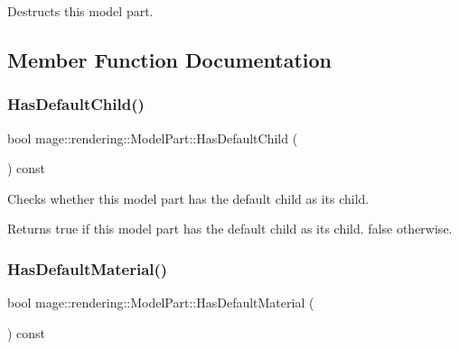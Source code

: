 Destructs this model part. 

\subsection{Member Function Documentation}
\hypertarget{structmage_1_1rendering_1_1_model_part_ab4118a267808c18556b0fa10949bcb0b}{}\label{structmage_1_1rendering_1_1_model_part_ab4118a267808c18556b0fa10949bcb0b} 
\subsubsection{\texorpdfstring{Has\+Default\+Child()}{HasDefaultChild()}}
{\footnotesize\ttfamily bool mage\+::rendering\+::\+Model\+Part\+::\+Has\+Default\+Child (\begin{DoxyParamCaption}{ }\end{DoxyParamCaption}) const\hspace{0.3cm}{\ttfamily [noexcept]}}

Checks whether this model part has the default child as its child.

\begin{DoxyReturn}{Returns}
{\ttfamily true} if this model part has the default child as its child. {\ttfamily false} otherwise. 
\end{DoxyReturn}
\hypertarget{structmage_1_1rendering_1_1_model_part_aae8cebe1ec39e939b53fc3f7330984a8}{}\label{structmage_1_1rendering_1_1_model_part_aae8cebe1ec39e939b53fc3f7330984a8} 
\subsubsection{\texorpdfstring{Has\+Default\+Material()}{HasDefaultMaterial()}}
{\footnotesize\ttfamily bool mage\+::rendering\+::\+Model\+Part\+::\+Has\+Default\+Material (\begin{DoxyParamCaption}{ }\end{DoxyParamCaption}) const\hspace{0.3cm}{\ttfamily [noexcept]}}


